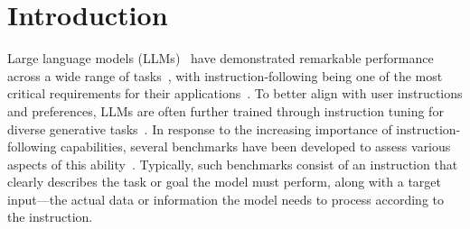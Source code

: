 \section{Introduction}


Large language models (LLMs)~\cite{radford2019language,touvron2023llama} have demonstrated remarkable performance across a wide range of tasks~\cite{wei2021finetuned}, with instruction-following being one of the most critical requirements for their applications~\cite{qin2024infobench}. 
To better align with user instructions and preferences, LLMs are often further trained through instruction tuning for diverse generative tasks~\cite{zhang2023instruction, peng2023instruction, zhou2024lima}. In response to the increasing importance of instruction-following capabilities, several benchmarks have been developed to assess various aspects of this ability~\cite{mishra2021cross, jiang2023followbench,zhou2023instruction,oh2024instructir}. Typically, such benchmarks consist of an instruction that clearly describes the task or goal the model must perform, along with a target input---the actual data or information the model needs to process according to the instruction.





